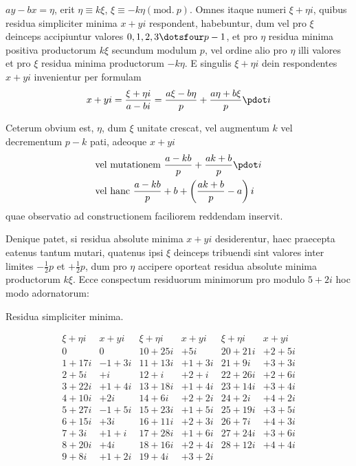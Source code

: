 %
$ay-bx=\eta$, erit $\eta\equiv k\xi$, $\xi\equiv-k\eta(\mathrm{mod.}\ p)$. Omnes itaque numeri $\xi+\eta i$, quibus residua simpliciter minima $x+yi$ respondent, habebuntur, dum vel pro $\xi$ deinceps accipiuntur valores $0,1,2,3\dotsfour p-1$, et pro $\eta$ residua minima positiva productorum $k\xi$ secundum modulum $p$, vel ordine alio pro $\eta$ illi valores et pro $\xi$ residua minima productorum $-k\eta$. E singulis $\xi+\eta i$ dein respondentes $x+yi$ invenientur per formulam
\[
x+yi=\frac{\xi+\eta i}{a-bi}=\frac{a\xi-b\eta}{p}+\frac{a\eta+b\xi}{p}\pdot i
\]

Ceterum obvium est, $\eta$, dum $\xi$ unitate crescat, vel augmentum $k$ vel decrementum $p-k$ pati, adeoque $x+yi$
\[
\begin{aligned}
&\text{vel mutationem }\frac{a-kb}{p}+\frac{ak+b}{p}\pdot i\\
&\text{vel hanc }\frac{a-kb}{p}+b+\left(\frac{ak+b}{p}-a\right)i
\end{aligned}
\]
quae observatio ad constructionem faciliorem reddendam inservit.

Denique patet, si residua absolute minima $x+yi$ desiderentur, haec praecepta eatenus tantum mutari, quatenus ipsi $\xi$ deinceps tribuendi sint valores inter limites $-\frac12p$ et $+\frac12p$, dum pro $\eta$ accipere oporteat residua absolute minima productorum $k\xi$. Ecce conspectum residuorum minimorum pro modulo $5+2i$ hoc modo adornatorum:

\begin{center}Residua simpliciter minima.\end{center}
{\small\setlength{\arraycolsep}{3pt}
\[
\begin{array}{r|r||r|r||r|r}
\xi+\eta i&x+yi&\xi+\eta i&x+yi&\xi+\eta i&x+yi\\\hline
0&0&10+25i&+5i&20+21i&+2+5i\\
1+17i&-1+3i&11+13i&+1+3i&21+9i&+3+3i\\
2+5i&+i&12+i&+2+i&22+26i&+2+6i\\
3+22i&+1+4i&13+18i&+1+4i&23+14i&+3+4i\\
4+10i&+2i&14+6i&+2+2i&24+2i&+4+2i\\
5+27i&-1+5i&15+23i&+1+5i&25+19i&+3+5i\\
6+15i&+3i&16+11i&+2+3i&26+7i&+4+3i\\
7+3i&+1+i&17+28i&+1+6i&27+24i&+3+6i\\
8+20i&+4i&18+16i&+2+4i&28+12i&+4+4i\\
9+8i&+1+2i&19+4i&+3+2i&&
\end{array}
\]
}

